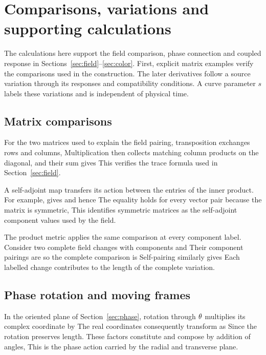\section{Comparisons, variations and supporting calculations}
\label{app:coupling}
The calculations here support the field comparison, phase connection and coupled response in Sections~\ref{sec:field}--\ref{sec:color}. First, explicit matrix examples verify the comparisons used in the construction. The later derivatives follow a source variation through its responses and compatibility conditions. A curve parameter $s$ labels these variations and is independent of physical time.

\subsection{Matrix comparisons}
For the two matrices used to explain the field pairing, transposition exchanges rows and columns,
\FieldExampleTransposeDisplay
Multiplication then collects matching column products on the diagonal,
\FieldExampleDiagonalDisplay
and their sum gives
\FieldExampleTraceDisplay
This verifies the trace formula used in Section~\ref{sec:field}.

A self-adjoint map transfers its action between the entries of the inner product. For example,
\FieldSelfAdjointExampleDisplay
gives
\FieldSelfAdjointActionsDisplay
and hence
\FieldSelfAdjointComparisonsDisplay
The equality holds for every vector pair because the matrix is symmetric,
\FieldSelfAdjointIdentityDisplay
This identifies symmetric matrices as the self-adjoint component values used by the field.

The product metric applies the same comparison at every component label. Consider two complete field changes with components
\FieldProductFirstExampleDisplay
and
\FieldProductSecondExampleDisplay
Their component pairings are
\FieldProductComparisonsDisplay
so the complete comparison is
\FieldProductTotalDisplay
Self-pairing similarly gives
\FieldProductLengthDisplay
Each labelled change contributes to the length of the complete variation.

\subsection{Phase rotation and moving frames}
In the oriented plane of Section~\ref{sec:phase}, rotation through $\theta$ multiplies its complex coordinate by
\FieldPlanePhaseFactorDisplay
The real coordinates consequently transform as
\FieldPlaneRotationCoordinatesDisplay
Since
\FieldPlanePhaseLengthDisplay
the rotation preserves length. These factors constitute
\FieldPlanePhaseGroupDisplay
and compose by addition of angles,
\FieldPlanePhaseCompositionDisplay
This is the phase action carried by the radial and transverse plane.

